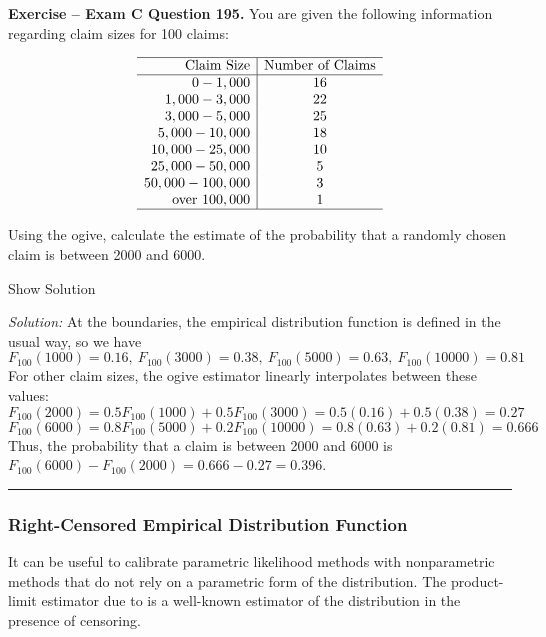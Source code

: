 \documentclass[]{book}
\theoremstyle{definition}
\theoremstyle{definition}
\theoremstyle{definition}
\theoremstyle{remark}
\begin{document}
\textbf{Exercise -- Exam C Question 195.} You are given the following
information regarding claim sizes for 100 claims:

\[
\begin{array}{r|c}
\hline
\text{Claim Size} &  \text{Number of Claims} \\
\hline
0 - 1,000 & 16 \\
1,000 - 3,000 & 22 \\
3,000 - 5,000 & 25 \\
5,000 - 10,000 & 18 \\
10,000 - 25,000 & 10 \\
25,000 - 50,000 & 5 \\
50,000 - 100,000 & 3 \\
\text{over  } 100,000 & 1 \\
\hline
\end{array}\]

Using the ogive, calculate the estimate of the probability that a
randomly chosen claim is between 2000 and 6000.

Show Solution

\hypertarget{toggleExamC195}{}
\emph{Solution:} At the boundaries, the empirical distribution function
is defined in the usual way, so we have
\[F_{100}(1000) = 0.16, \ F_{100}(3000)=0.38, \ F_{100}(5000)=0.63, \ F_{100}(10000)=0.81\]
For other claim sizes, the ogive estimator linearly interpolates between
these values:
\[F_{100}(2000) = 0.5F_{100}(1000) + 0.5F_{100}(3000) = 0.5(0.16)+0.5(0.38)=0.27\]
\[F_{100}(6000)=0.8F_{100}(5000)+0.2F_{100}(10000) = 0.8(0.63)+0.2(0.81)=0.666\]
Thus, the probability that a claim is between 2000 and 6000 is
\(F_{100}(6000) - F_{100}(2000) = 0.666-0.27 = 0.396\).

\begin{center}\rule{0.5\linewidth}{\linethickness}\end{center}

\subsubsection{Right-Censored Empirical Distribution
Function}\label{right-censored-empirical-distribution-function}

It can be useful to calibrate parametric likelihood methods with
nonparametric methods that do not rely on a parametric form of the
distribution. The product-limit estimator due to \citep{kaplan1958} is a
well-known estimator of the distribution in the presence of censoring.
\end{document}
